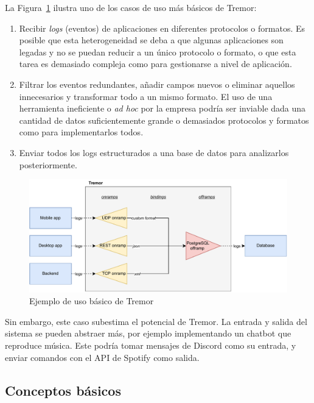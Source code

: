 La Figura~\ref{fig:tremor_example} ilustra uno de los casos de uso más básicos
de Tremor:

\begin{enumerate}
    \item Recibir \emph{logs} (eventos) de aplicaciones en diferentes protocolos
        o formatos. Es posible que esta heterogeneidad se deba a que algunas
        aplicaciones son legadas y no se puedan reducir a un único protocolo o
        formato, o que esta tarea es demasiado compleja como para gestionarse a
        nivel de aplicación.

    \item Filtrar los eventos redundantes, añadir campos nuevos o eliminar
        aquellos innecesarios y transformar todo a un mismo formato. El uso de
        una herramienta ineficiente o \emph{ad hoc} por la empresa podría ser
        inviable dada una cantidad de datos suficientemente grande o demasiados
        protocolos y formatos como para implementarlos todos.

    \item Enviar todos los logs estructurados a una base de datos para
        analizarlos posteriormente.

\end{enumerate}

\begin{figure}
    \centering
    \includegraphics[width=\textwidth]{./Imagenes/example.pdf}
    \caption{Ejemplo de uso básico de Tremor}%
    \label{fig:tremor_example}
\end{figure}

Sin embargo, este caso subestima el potencial de Tremor. La entrada y salida del
sistema se pueden abstraer más, por ejemplo implementando un chatbot que
reproduce música. Este podría tomar mensajes de Discord como su entrada, y
enviar comandos con el API de Spotify como salida.

\subsection{Conceptos básicos}

